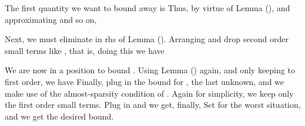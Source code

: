 The first quantity we want to bound away is
Thus, by virtue of Lemma (), and approximating  and so on,

Next, we must eliminate  in rhs of Lemma ().
Arranging and drop second order small terms like , that is,
doing this we have

We are now in a position to bound .
Using Lemma () again, and only keeping to first order, we have
Finally, plug in the bound for , the last unknown, and we make use of the almost-sparsity condition of .
Again for simplicity, we keep only the first order small terms.
Plug in  and  we get, finally,
Set  for the worst situation, and we get the desired bound.

\stopsubsection
\stopsection


